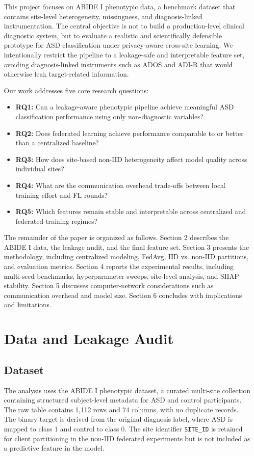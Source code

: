 \documentclass[sigconf]{acmart}
\begin{document}
This project focuses on ABIDE I phenotypic data, a benchmark dataset that contains site-level heterogeneity, missingness, and diagnosis-linked instrumentation. The central objective is not to build a production-level clinical diagnostic system, but to evaluate a realistic and scientifically defensible prototype for ASD classification under privacy-aware cross-site learning. We intentionally restrict the pipeline to a leakage-safe and interpretable feature set, avoiding diagnosis-linked instruments such as ADOS and ADI-R that would otherwise leak target-related information.

Our work addresses five core research questions:

\begin{itemize}[leftmargin=*]
    \item \textbf{RQ1:} Can a leakage-aware phenotypic pipeline achieve meaningful ASD classification performance using only non-diagnostic variables? 
    \item \textbf{RQ2:} Does federated learning achieve performance comparable to or better than a centralized baseline?
    \item \textbf{RQ3:} How does site-based non-IID heterogeneity affect model quality across individual sites?
    \item \textbf{RQ4:} What are the communication overhead trade-offs between local training effort and FL rounds?
    \item \textbf{RQ5:} Which features remain stable and interpretable across centralized and federated training regimes?
\end{itemize}

The remainder of the paper is organized as follows. Section 2 describes the ABIDE I data, the leakage audit, and the final feature set. Section 3 presents the methodology, including centralized modeling, FedAvg, IID vs. non-IID partitions, and evaluation metrics. Section 4 reports the experimental results, including multi-seed benchmarks, hyperparameter sweeps, site-level analysis, and SHAP stability. Section 5 discusses computer-network considerations such as communication overhead and model size. Section 6 concludes with implications and limitations.

\section{Data and Leakage Audit}
\subsection{Dataset}
The analysis uses the ABIDE I phenotypic dataset, a curated multi-site collection containing structured subject-level metadata for ASD and control participants. The raw table contains 1,112 rows and 74 columns, with no duplicate records. The binary target is derived from the original diagnosis label, where ASD is mapped to class 1 and control to class 0. The site identifier \texttt{SITE\_ID} is retained for client partitioning in the non-IID federated experiments but is not included as a predictive feature in the model.
\end{document}
